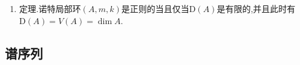 \begin{enumerate}
\begin{itemize}
\begin{proof}
    		设$Z$为环$A$的所有零因子构成的集合,那么它是全部有限个伴随素理想的并,按照条件有$m-m^2\subset Z\subset p_1\cup p_2\cup\cdots\cup p_n$.如果我们能够证明$m\subset\cup_ip_i$,那么素理想avoidance引理得到$m$恰好是某个$p_i=\mathrm{Ann}(a)$,于是$a\in m$就满足$am=\{0\}$.
    		
    		于是问题归结为证明$m^2\subset\cup_ip_i$.由NAK引理得$m/m^2\not=0$,否则$m=0$没什么需要证的.于是存在$x\in m-m^2\subset\cup_ip_i$.任取$y\in m^2$,对每个整数$s\ge1$,有$x+y^s\in m-m^2\subset\cup_ip_i$,于是对每个$s$都有一个指标$j(s)$使得$x+y^s\in p_{j(s)}$.但是这里指标只有有限个,而$s$可以取无限个,于是存在正整数$t>s$使得$x+y^s,x+y^t\in p_j$,于是$y^s(1-y^{t-s})\in p_j$,但是$1-y^{t-s}$是单位,导致$y\in p_j$.这就说明了$m^2\subset\cup_ip_i$.
    	\end{proof}
        \item 如果$0<\mathrm{D}(A)=n<\infty$,那么$m-m^2$中存在非零因子.
        \begin{proof}
        	
        	按照上一条,只需说明不存在非零的$a\in A$使得$am=\{0\}$.假设存在这样的$0\not=a\in A$,取$\mu:A\to A$为数乘$a$的同态,那么$m\subset\ker\mu$,这个包含关系不能是严格的,否则$\ker\mu=A$,但是幺元明显不在$\ker\mu$中.于是$\ker\mu=m$.
        	
        	于是$k=A/m\cong A/\ker\mu\cong\mathrm{im}\mu=Aa$.考虑短正合列$0\to Aa\to A\to A/Aa\to0$,我们证明过此时要么$\mathrm{pd}(A/Aa)=\mathrm{pd}(Aa)+1$,要么$\mathrm{A/Aa}=0$.在前者情况下,有$\mathrm{pd}(A/Aa)>\mathrm{pd}(k)$,和我们证明过的局部环的整体维数必然是剩余类域的投射维数相矛盾.对于后者情况有$0=\mathrm{pd}(Aa)=\mathrm{pd}(k)=\mathrm{D}(A)$,这和条件矛盾.
        \end{proof}
    \end{itemize}
    \item 定理.诺特局部环$(A,m,k)$是正则的当且仅当$\mathrm{D}(A)$是有限的,并且此时有$\mathrm{D}(A)=V(A)=\dim A$.
\end{enumerate}
\newpage
\subsection{谱序列}

